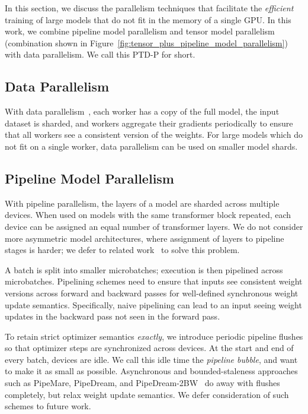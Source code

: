 \documentclass[sigconf,nonacm]{acmart}
\begin{document}
In this section, we discuss the parallelism techniques that facilitate the \emph{efficient} training of large models that do not fit in the memory of a single GPU. In this work, we combine pipeline model parallelism and tensor model parallelism (combination shown in Figure~\ref{fig:tensor_plus_pipeline_model_parallelism}) with data parallelism. We call this PTD-P for short.

\subsection{Data Parallelism}

With data parallelism~\cite{xing2015petuum, pytorchdistributed}, each worker has a copy of the full model, the input dataset is sharded, and workers aggregate their gradients periodically to ensure that all workers see a consistent version of the weights. For large models which do not fit on a single worker, data parallelism can be used on smaller model shards.

\subsection{Pipeline Model Parallelism}

With pipeline parallelism, the layers of a model are sharded across multiple devices. When used on models with the same transformer block repeated, each device can be assigned an equal number of transformer layers. We do not consider more asymmetric model architectures, where assignment of layers to pipeline stages is harder; we defer to related work~\cite{narayanan2019pipedream, flexflow, tarnawski2020efficient} to solve this problem.

A batch is split into smaller microbatches; execution is then pipelined across microbatches. Pipelining schemes need to ensure that inputs see consistent weight versions across forward and backward passes for well-defined synchronous weight update semantics. Specifically, naive pipelining can lead to an input seeing weight updates in the backward pass not seen in the forward pass.

To retain strict optimizer semantics \emph{exactly}, we introduce periodic pipeline flushes so that optimizer steps are synchronized across devices. At the start and end of every batch, devices are idle. We call this idle time the \emph{pipeline bubble}, and want to make it as small as possible. Asynchronous and bounded-staleness approaches such as PipeMare, PipeDream, and PipeDream-2BW~\cite{yang2021pipemare, pb2021kosson, narayanan2019pipedream, narayanan2021memory} do away with flushes completely, but relax weight update semantics. We defer consideration of such schemes to future work.
\end{document}
